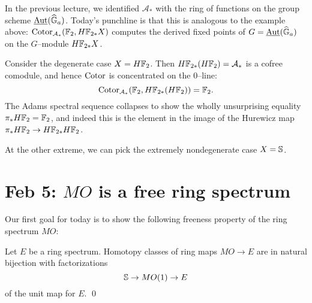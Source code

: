 
\begin{example}
In the previous lecture, we identified $\mathcal A_*$ with the ring of functions on the group scheme $\underline{\Aut}(\G_a)$.  Today's punchline is that this is analogous to the example above: $\Cotor_{\mathcal A_*}(\F_2, H\F_{2*} X)$ computes the derived fixed points of $G = \underline{\Aut}(\G_a)$ on the $G$--module $H\F_{2*} X$.
\end{example}

\begin{example}
Consider the degenerate case $X = H\F_2$.  Then $H\F_{2*}(H\F_2) = \mathcal A_*$ is a cofree comodule, and hence $\Cotor$ is concentrated on the $0$--line: \[\Cotor_{\mathcal A_*}(\F_2, H\F_{2*}(H\F_2)) = \F_2.\]  The Adams spectral sequence collapses to show the wholly unsurprising equality $\pi_* H\F_2 = \F_2$, and indeed this is the element in the image of the Hurewicz map $\pi_* H\F_2 \to H\F_{2*} H\F_2$.
\end{example}

\begin{example}
At the other extreme, we can pick the extremely nondegenerate case $X = \S$. 
\end{example}










\section{Feb 5: $MO$ is a free ring spectrum}

Our first goal for today is to show the following freeness property of the ring spectrum $MO$:
\begin{theorem}
Let $E$ be a ring spectrum.  Homotopy classes of ring maps $MO \to E$ are in natural bijection with factorizations \[\S \to MO(1) \to E\] of the unit map for $E$. \qed
\end{theorem}


